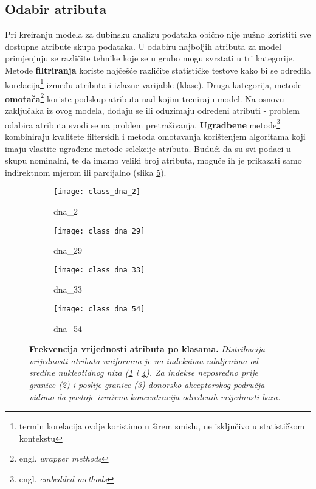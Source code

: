 \subsection{Odabir atributa}
Pri kreiranju modela za dubinsku analizu podataka obično nije nužno koristiti sve dostupne atribute skupa podataka. U odabiru najboljih atributa za model primjenjuju se različite tehnike koje se u grubo mogu svrstati u tri kategorije. Metode \textbf{filtriranja} koriste najčešće različite statističke testove kako bi se odredila korelacija\footnote{termin korelacija ovdje koristimo u širem smislu, ne isključivo u statističkom kontekstu} između atributa i izlazne varijable (klase). Druga kategorija, metode \textbf{omotača}\footnote{engl. \textit{wrapper methods}} koriste podskup atributa nad kojim treniraju model. Na osnovu zaključaka iz ovog modela, dodaju se ili oduzimaju određeni atributi - problem odabira atributa svodi se na problem pretraživanja. \textbf{Ugradbene} metode\footnote{engl. \textit{embedded methods}} kombiniraju kvalitete filterskih i metoda omotavanja korištenjem algoritama koji imaju vlastite ugrađene metode selekcije atributa.
Budući da su svi podaci u skupu nominalni, te da imamo veliki broj atributa, moguće ih je prikazati samo indirektnom mjerom ili parcijalno (slika \ref{fig:class_dna_x}).
\begin{center}
   \begin{figure}[ht!]
   \begin{subfigure}{.5\textwidth}
         \texttt{[image: class\_dna\_2]}
         \caption{dna{\_}2}
         \label{fig:class_dna_2}
   \end{subfigure}
   \begin{subfigure}{.5\textwidth}
         \texttt{[image: class\_dna\_29]}
         \caption{dna{\_}29}
         \label{fig:class_dna_29}
   \end{subfigure}
   \begin{subfigure}{.5\textwidth}
         \texttt{[image: class\_dna\_33]}
         \caption{dna{\_}33}
         \label{fig:class_dna_33}
   \end{subfigure}
   \begin{subfigure}{.5\textwidth}
         \texttt{[image: class\_dna\_54]}
         \caption{dna{\_}54}
         \label{fig:class_dna_54}
   \end{subfigure}
   \caption[Dijagram rasipanja vrijednosti atributa po klasama]
   {\textbf{Frekvencija vrijednosti atributa po klasama.}\textit{ Distribucija vrijednosti atributa uniformna je na indeksima udaljenima od sredine nukleotidnog niza (\ref{fig:class_dna_2} i \ref{fig:class_dna_54}). Za indekse neposredno prije granice (\ref{fig:class_dna_29}) i poslije granice (\ref{fig:class_dna_33}) donorsko-akceptorskog područja vidimo da postoje izražena koncentracija određenih vrijednosti baza.}}
    \label{fig:class_dna_x}
   \end{figure}
\end{center}
